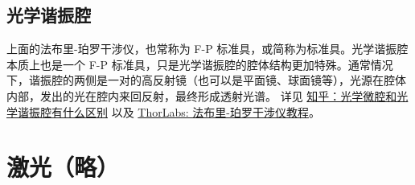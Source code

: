 \documentclass[UTF8]{report}
\theoremstyle{MyLineTheoremStyle} %
\theoremstyle{MyBlockTheoremStyle} %
\theoremstyle{MySubsubsectionStyle} %
\begin{document}

\subsection{光学谐振腔}

上面的法布里-珀罗干涉仪，也常称为 F-P 标准具，或简称为标准具。光学谐振腔本质上也是一个 F-P 标准具，只是光学谐振腔的腔体结构更加特殊。通常情况下，谐振腔的两侧是一对的高反射镜（也可以是平面镜、球面镜等），光源在腔体内部，发出的光在腔内来回反射，最终形成透射光谱。
详见 \href{https://www.zhihu.com/question/476559619/answer/3015092750}{知乎：光学微腔和光学谐振腔有什么区别} 以及 \href{https://www.thorlabs.com/newgrouppage9.cfm?objectgroup\_id=9021}{ThorLabs: 法布里-珀罗干涉仪教程}。

\section{激光（略）}

\newpage
\end{document}
